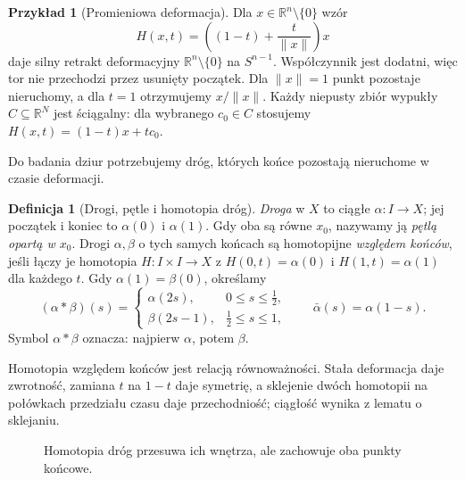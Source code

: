 \documentclass[11pt,a4paper,oneside]{report}
\newcommand{\R}{\mathbb{R}}
\theoremstyle{plain}
\theoremstyle{definition}
\newtheorem{definicja}[twierdzenie]{Definicja}
\newtheorem{przyklad}[twierdzenie]{Przykład}
\theoremstyle{remark}
\begin{document}
\begin{przyklad}[Promieniowa deformacja]
\label{prz:retrakcja-pierscien}
Dla $x\in\R^n\setminus\{0\}$ wzór
\[
 H(x,t)=\left((1-t)+\frac{t}{\|x\|}\right)x
\]
daje silny retrakt deformacyjny
$\R^n\setminus\{0\}$ na $S^{n-1}$.
Współczynnik jest dodatni, więc tor
nie przechodzi przez usunięty początek.
Dla $\|x\|=1$ punkt pozostaje nieruchomy,
a dla $t=1$ otrzymujemy $x/\|x\|$.
Każdy niepusty zbiór wypukły $C\subseteq\R^N$ jest ściągalny:
dla wybranego $c_0\in C$ stosujemy
$H(x,t)=(1-t)x+tc_0$.
\end{przyklad}

Do badania dziur potrzebujemy dróg,
których końce pozostają nieruchome w czasie deformacji.

\begin{definicja}[Drogi, pętle i homotopia dróg]
\label{def:droga-petla}
\emph{Droga} w $X$ to ciągłe
$\alpha:I\to X$; jej początek i koniec
to $\alpha(0)$ i $\alpha(1)$.
Gdy oba są równe $x_0$, nazywamy ją
\emph{pętlą opartą w $x_0$}.
Drogi $\alpha,\beta$ o tych samych końcach
są homotopijne \emph{względem końców},
jeśli łączy je homotopia $H:I\times I\to X$
z $H(0,t)=\alpha(0)$ i
$H(1,t)=\alpha(1)$ dla każdego $t$.
Gdy $\alpha(1)=\beta(0)$, określamy
\[
 (\alpha*\beta)(s)=
 \begin{cases}
  \alpha(2s),&0\leq s\leq\tfrac12,\\
  \beta(2s-1),&\tfrac12\leq s\leq1,
 \end{cases}
 \qquad \bar\alpha(s)=\alpha(1-s).
\]
Symbol $\alpha*\beta$ oznacza: najpierw $\alpha$,
potem $\beta$.
\end{definicja}

Homotopia względem końców jest relacją równoważności.
Stała deformacja daje zwrotność, zamiana $t$ na $1-t$ daje
symetrię, a sklejenie dwóch homotopii na połówkach przedziału
czasu daje przechodniość; ciągłość wynika z lematu o sklejaniu.

\begin{figure}[!htbp]
\centering
{}
\caption{Homotopia dróg przesuwa ich wnętrza,
ale zachowuje oba punkty końcowe.}
\label{fig:homotopia-drog}
\end{figure}
\end{document}

